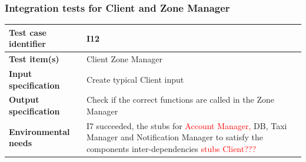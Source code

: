 \documentclass[a4paper,11pt]{report} %
\begin{document}
		\subsubsection{Integration tests for Client and Zone Manager} \label{sec:3.1.9}
			\begin{minipage}{\linewidth}
			\end{minipage}		
		\begin{center}
			\renewcommand{\arraystretch}{1.2}
			\setlength{\tabcolsep}{24pt}
			\begin{tabular}{ l  p{9cm}}\hline
				\textbf{Test case identifier} & I12\\\hline
				\textbf{Test item(s)} & Client \textrightarrow Zone Manager\\\hline
				\textbf{Input specification} & Create typical Client input \\\hline
				\textbf{Output specification} & Check if the correct functions are called in the Zone Manager\\\hline
				\textbf{Environmental needs} &  I7 succeeded, the stubs for \textcolor{red}{Account Manager, }DB, Taxi Manager and Notification Manager to satisfy the components inter-dependencies \textcolor{red}{stubs Client???}\\\hline
			\end{tabular}
		\end{center}	

		\pagebreak
\end{document}
